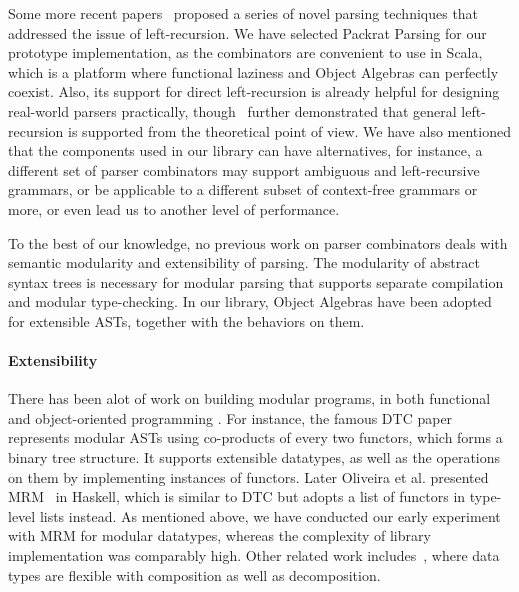Some more recent papers~\cite{Ford2002,Might2011,Frost2008}
 proposed a series of
novel parsing techniques that addressed the issue
of left-recursion. We have selected Packrat
Parsing for our prototype implementation, as the combinators are
convenient to use in Scala, which is a platform where functional
laziness and Object Algebras can perfectly coexist. Also, its support
for direct left-recursion is already helpful for designing real-world
parsers practically, though~\cite{warth2008} further demonstrated that
general left-recursion is supported from the theoretical point of
view. We have also mentioned that the components used in our library
can have alternatives, for instance, a different set of parser
combinators may support ambiguous and left-recursive grammars, or be
applicable to a different subset of context-free grammars or more, or
even lead us to another level of performance.


To the best of our knowledge, no previous work on parser combinators
deals with semantic modularity and
extensibility of parsing. The modularity of abstract syntax trees is
necessary for modular parsing that supports separate compilation and
modular type-checking. In our library, Object Algebras have been
adopted for extensible ASTs, together with the behaviors on them.

\paragraph{Extensibility} There has been alot of work on building
modular programs, in both functional and object-oriented programming .
For instance, the famous DTC paper~\cite{swierstra2008} represents
modular ASTs using co-products of every two functors, which forms a
binary tree structure. It supports extensible datatypes, as well as
the operations on them by implementing instances of functors. Later
Oliveira et al. presented MRM~\cite{Oliveira2015} in Haskell, which is
similar to DTC but adopts a list of functors in type-level lists
instead. As mentioned above, we have conducted our early experiment
with MRM for modular datatypes, whereas the complexity of library
implementation was comparably high. Other related work
includes~\cite{Bahr2014}, where data types are flexible with
composition as well as decomposition.

